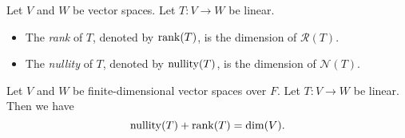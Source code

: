 \begin{definition}
  \label{def:rank-nullity}
  Let $V$ and $W$ be vector spaces. Let $T: V \to W$ be linear.
  \begin{itemize}
    \item The \emph{rank} of $T$, denoted by $\operatorname{rank}(T)$,
      is the dimension of $\mathcal{R}(T)$.
    \item The \emph{nullity} of $T$, denoted by $\operatorname{nullity}(T)$,
      is the dimension of $\mathcal{N}(T)$.
  \end{itemize}
\end{definition}

\begin{theorem}
  \label{thm:rank-nullity}
  Let $V$ and $W$ be finite-dimensional vector spaces over $F$.
  Let $T: V \to W$ be linear.
  Then we have
  \begin{equation*}
    \operatorname{nullity}(T) + \operatorname{rank}(T) = \dim(V).
  \end{equation*}
\end{theorem}
